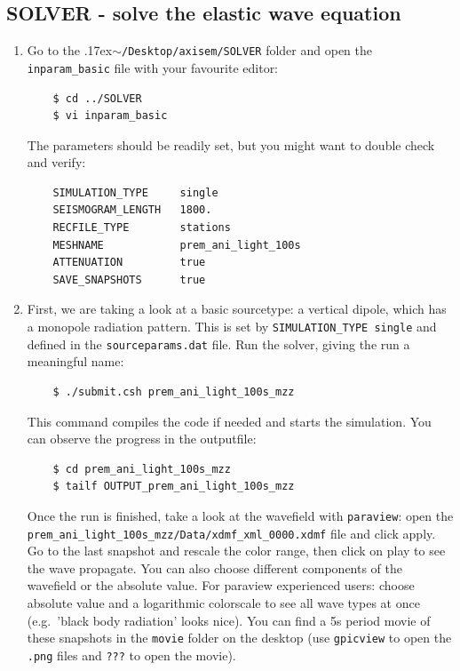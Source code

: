 \documentclass{article}
\newcommand{\ttilde}[0]{\raise.17ex\hbox{$\scriptstyle\sim$}}
\begin{document}
\subsection{SOLVER - solve the elastic wave equation}
    
\begin{enumerate}
    \item Go to the \ttilde\verb|/Desktop/axisem/SOLVER| folder and open the
    \verb|inparam_basic| file with your favourite editor:
    \begin{verbatim}
    $ cd ../SOLVER
    $ vi inparam_basic
    \end{verbatim}
    The parameters should be readily set, but you might want to double check and verify:
    \begin{verbatim}
    SIMULATION_TYPE     single
    SEISMOGRAM_LENGTH   1800.
    RECFILE_TYPE        stations 
    MESHNAME            prem_ani_light_100s
    ATTENUATION         true 
    SAVE_SNAPSHOTS      true  
    \end{verbatim}
    \item First, we are taking a look at a basic sourcetype: a vertical dipole, which has
    a monopole radiation pattern. This is set by \verb|SIMULATION_TYPE single| and defined
    in the \verb|sourceparams.dat| file. Run the solver, giving the run a meaningful name:
    \begin{verbatim}
    $ ./submit.csh prem_ani_light_100s_mzz
    \end{verbatim}
    This command compiles the code if needed and starts the simulation. You can observe
    the progress in the outputfile:
    \begin{verbatim}
    $ cd prem_ani_light_100s_mzz
    $ tailf OUTPUT_prem_ani_light_100s_mzz
    \end{verbatim}
    Once the run is finished, take a look at the wavefield with \verb|paraview|: open
    the \verb|prem_ani_light_100s_mzz/Data/xdmf_xml_0000.xdmf| file and click apply. Go to
    the last snapshot and rescale the color range, then click on play to see the wave
    propagate.  You can also choose different components of the wavefield or the absolute
    value.  For paraview experienced users: choose absolute value and a logarithmic
    colorscale to see all wave types at once (e.g.\ 'black body radiation' looks nice).
    You can find a 5s period movie of these snapshots in the \verb|movie| folder on the
    desktop (use \verb|gpicview| to open the \verb|.png| files and \verb|???| to open the
    movie).
   

\end{enumerate}
\end{document}
